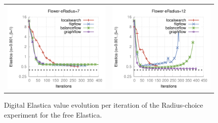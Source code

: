 \begin{figure}
\begin{tabular}{cc}
\includegraphics[scale=0.4]{figures/chapter9/free-elastica/plots/iteration/radius_choice/len_pen_0.001/radius-7/flower.pdf} & 
\includegraphics[scale=0.4]{figures/chapter9/free-elastica/plots/iteration/radius_choice/len_pen_0.001/radius-12/flower.pdf}
\end{tabular}
\caption{Digital Elastica value evolution per iteration of the Radius-choice experiment for the free Elastica.}
\label{fig:plots-free-elastica-radius-choice}
\end{figure}


